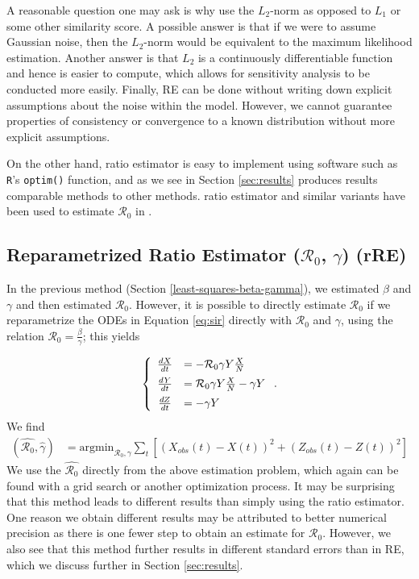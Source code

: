 \documentclass[12pt]{article}
\newcommand{\rr}{\ensuremath{\mathcal{R}_0}}
\begin{document}
A reasonable question one may ask is why use the $L_2$-norm as opposed to $L_1$ or some other similarity score.  A possible answer is that if we were to assume Gaussian noise, then the $L_2$-norm would be equivalent to the maximum likelihood estimation.  Another answer is that $L_2$ is a continuously differentiable function and hence is easier to compute, which allows for sensitivity analysis to  be conducted more easily.  Finally, RE can be done without writing down explicit assumptions about the noise within the model.  However, we cannot guarantee properties of consistency or convergence to a known distribution without more explicit assumptions.  

On the other hand, ratio estimator is easy to implement using software such as \texttt{R}'s \texttt{optim()} function, and as we see in Section \ref{sec:results} produces results comparable methods to other methods.  ratio estimator and similar variants have been used to estimate $\rr$ in \cite{majumder2016}.

\subsection{Reparametrized Ratio Estimator ($\rr$, $\gamma$) (rRE)}\label{reparametrized-least-squares-rux5f0-gamma}

In the previous method (Section \ref{least-squares-beta-gamma}), we estimated $\beta$ and $\gamma$ and then estimated $\rr$.  However, it is possible to directly estimate $\rr$ if we reparametrize the ODEs in Equation \eqref{eq:sir} directly with \(\rr\) and \(\gamma\), using the relation $\rr = \frac{\beta}{\gamma}$; this yields

\begin{align*}
  \left \{
  \begin{array}{cl}
    \frac{dX}{dt} &= - \rr \gamma Y \frac{X}{N}\vspace{.5em}\\
    \frac{dY}{dt} &=  \rr \gamma Y \frac{X}{N}  - \gamma Y\vspace{.5em} \\
    \frac{dZ}{dt} &=  - \gamma Y 
  \end{array}
  \right . .
  \end{align*}
We find
\begin{align*}
(\hat{\rr}, \hat{\gamma} ) &= \text{argmin}_{\rr, \gamma} \sum_{t} \left [ \left (X_{obs}(t) - X(t)\right )^2 + \left ( Z_{obs}(t) - Z(t) \right )^2 \right ]
\end{align*}
We use the $\hat{\rr}$ directly from the above estimation problem, which again can be found with a grid search or another optimization process.  It may be surprising that this method leads to different results than simply using the ratio estimator.  One reason we obtain different results may be attributed to better numerical precision as there is one fewer step to obtain an estimate for $\rr$.  However, we also see that this method further results in different standard errors than in RE, which we discuss further in Section \ref{sec:results}.
\end{document}

